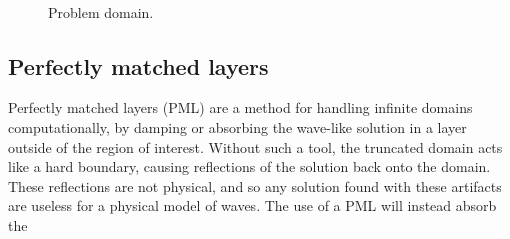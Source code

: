 \begin{figure}[ht!]
	\centering
	\\
	\caption{Problem domain.\label{fig:problem_domain}}
\end{figure}




\subsection{Perfectly matched layers}

Perfectly matched layers (PML) are a method for handling infinite domains computationally, by damping or absorbing the wave-like solution in a layer outside of the region of interest.
Without such a tool, the truncated domain acts like a hard boundary, causing reflections of the solution back onto the domain.
These reflections are not physical, and so any solution found with these artifacts are useless for a physical model of waves.
The use of a PML will instead absorb the 



